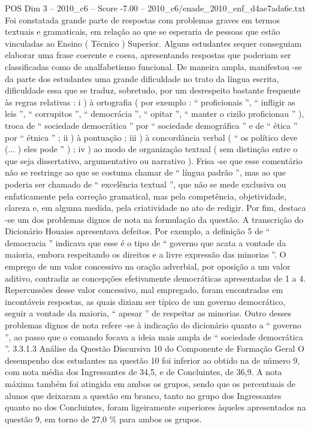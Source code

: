 \begin{textsample}{POS Dim 3 – 2010\_c6 – Score -7.00 – 2010\_c6/enade\_2010\_enf\_d4ae7ada6c.txt}
Foi constatada grande parte de respostas com problemas graves em termos textuais e gramaticais, em relação ao que se esperaria de pessoas que estão vinculadas ao Ensino ( Técnico ) Superior.
Alguns estudantes sequer conseguiam elaborar uma frase coerente e coesa, apresentando respostas que poderiam ser classificadas como de analfabetismo funcional.
De maneira ampla, manifestou -se da parte dos estudantes uma grande dificuldade no trato da língua escrita, dificuldade essa que se traduz, sobretudo, por um desrespeito bastante frequente às regras relativas : i ) à ortografia ( por exemplo : “ proficionais ”, “ infligir as leis ”, “ corrupitos ”, “ democrácia ”, “ opitar ”, “ manter o cizilo proficionau ” ), troca de “ sociedade democrática ” por “ sociedade demográfica ” e de “ ética ” por “ étnica ” ; ii ) à pontuação ; iii ) à concordância verbal ( “ os político deve (... ) eles pode ” ) ; iv ) ao modo de organização textual ( sem distinção entre o que seja dissertativo, argumentativo ou narrativo ).
Frisa -se que esse comentário não se restringe ao que se costuma chamar de “ língua padrão ”, mas ao que poderia ser chamado de “ excelência textual ”, que não se mede exclusiva ou enfaticamente pela correção gramatical, mas pela competência, objetividade, clareza e, em alguma medida, pela criatividade no ato de redigir.
Por fim, destaca -se um dos problemas dignos de nota na formulação da questão.
A transcrição do Dicionário Houaiss apresentava defeitos.
Por exemplo, a definição 5 de “ democracia ” indicava que esse é o tipo de “ governo que acata a vontade da maioria, embora respeitando os direitos e a livre expressão das minorias ”.
O emprego de um valor concessivo na oração adverbial, por oposição a um valor aditivo, contradiz as concepções efetivamente democráticas apresentadas de 1 a 4.
Repercussões desse valor concessivo, mal empregado, foram encontradas em incontáveis respostas, as quais diziam ser típico de um governo democrático, seguir a vontade da maioria, “ apesar ” de respeitar as minorias.
Outro desses problemas dignos de nota refere -se à indicação do dicionário quanto a “ governo ”, ao passo que o comando focava a ideia mais ampla de “ sociedade democrática ”. 3.3.1.3 Análise da Questão Discursiva 10 do Componente de Formação Geral O desempenho dos estudantes na questão 10 foi inferior ao obtido na de número 9, com nota média dos Ingressantes de 34,5, e de Concluintes, de 36,9.
A nota máxima também foi atingida em ambos os grupos, sendo que os percentuais de alunos que deixaram a questão em branco, tanto no grupo dos Ingressantes quanto no dos Concluintes, foram ligeiramente superiores àqueles apresentados na questão 9, em torno de 27,0 \% para ambos os grupos.

\end{textsample}
